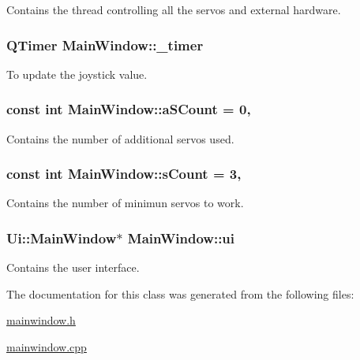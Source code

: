 Contains the thread controlling all the servos and external hardware. 

\hypertarget{a00004_a254b03b878cfda75c1c411a2f8568d33}{}
\subsubsection[{\+\_\+timer}]{\setlength{\rightskip}{0pt plus 5cm}Q\+Timer Main\+Window\+::\+\_\+timer\hspace{0.3cm}{\ttfamily [private]}}\label{a00004_a254b03b878cfda75c1c411a2f8568d33}


To update the joystick value. 

\hypertarget{a00004_a42c44af9c0eebc33f4e81f02e15b0461}{}
\subsubsection[{a\+S\+Count}]{\setlength{\rightskip}{0pt plus 5cm}const int Main\+Window\+::a\+S\+Count = 0\hspace{0.3cm}{\ttfamily [static]}, {\ttfamily [private]}}\label{a00004_a42c44af9c0eebc33f4e81f02e15b0461}


Contains the number of additional servos used. 

\hypertarget{a00004_a646727b1c45c72638325adfd460649c0}{}
\subsubsection[{s\+Count}]{\setlength{\rightskip}{0pt plus 5cm}const int Main\+Window\+::s\+Count = 3\hspace{0.3cm}{\ttfamily [static]}, {\ttfamily [private]}}\label{a00004_a646727b1c45c72638325adfd460649c0}


Contains the number of minimun servos to work. 

\hypertarget{a00004_a35466a70ed47252a0191168126a352a5}{}
\subsubsection[{ui}]{\setlength{\rightskip}{0pt plus 5cm}Ui\+::\+Main\+Window$\ast$ Main\+Window\+::ui\hspace{0.3cm}{\ttfamily [private]}}\label{a00004_a35466a70ed47252a0191168126a352a5}


Contains the user interface. 



The documentation for this class was generated from the following files\+:\begin{DoxyCompactItemize}
\item 
\hyperlink{a00016}{mainwindow.\+h}\item 
\hyperlink{a00015}{mainwindow.\+cpp}\end{DoxyCompactItemize}
